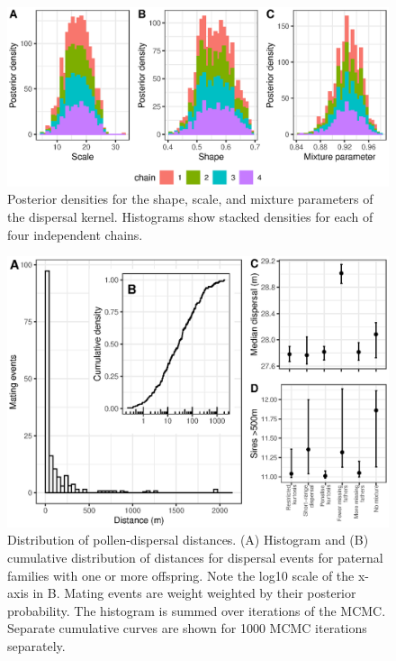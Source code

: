 \documentclass[10pt, a4paper, twocolumn]{article} %
\begin{document}
\begin{figure}
    \centering
    \includegraphics{posterior_distributions.eps}
    \caption{
        Posterior densities for the shape, scale, and mixture parameters of the dispersal kernel.
        Histograms show stacked densities for each of four independent chains.
    }
    \label{fig:posterior_summaries}
\end{figure}

\begin{figure}
    \centering
    \includegraphics{dispersal.eps}
    \caption{
        Distribution of pollen-dispersal distances.
        (A) Histogram and (B) cumulative distribution of distances for dispersal events for paternal families with one or more offspring.
        Note the log10 scale of the x-axis in B.
        Mating events are weight weighted by their posterior probability.
        The histogram is summed over iterations of the MCMC.
        Separate cumulative curves are shown for 1000 MCMC iterations separately.
    }
    \label{fig:dispersal}
\end{figure}
\end{document}
